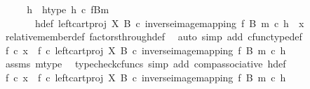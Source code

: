 \begin{isabellebody}
\ \ \isamarkupfalse%
\ \isamarkupfalse%
\ h\ \ h{\isacharunderscore}{\kern0pt}type{\isacharcolon}{\kern0pt}\ {\isachardoublequoteopen}h\ {\isasymin}\isactrlsub c\ {\isacharparenleft}{\kern0pt}f\isactrlsup {\isacharminus}{\kern0pt}B{\isasymrparr}\isactrlbsub m\isactrlesub {\isacharparenright}{\kern0pt}{\isachardoublequoteclose}\isanewline
\ \ \ \ \ \ \ h{\isacharunderscore}{\kern0pt}def{\isacharcolon}{\kern0pt}\ {\isachardoublequoteopen}{\isacharparenleft}{\kern0pt}left{\isacharunderscore}{\kern0pt}cart{\isacharunderscore}{\kern0pt}proj\ X\ B\ {\isasymcirc}\isactrlsub c\ inverse{\isacharunderscore}{\kern0pt}image{\isacharunderscore}{\kern0pt}mapping\ f\ B\ m{\isacharparenright}{\kern0pt}\ {\isasymcirc}\isactrlsub c\ h\ {\isacharequal}{\kern0pt}\ x{\isachardoublequoteclose}\isanewline
\ \ \ \ \isamarkupfalse%
\ relative{\isacharunderscore}{\kern0pt}member{\isacharunderscore}{\kern0pt}def{}\ factors{\isacharunderscore}{\kern0pt}through{\isacharunderscore}{\kern0pt}def\ \isamarkupfalse%
\ {\isacharparenleft}{\kern0pt}auto\ simp\ add{\isacharcolon}{\kern0pt}\ cfunc{\isacharunderscore}{\kern0pt}type{\isacharunderscore}{\kern0pt}def{\isacharparenright}{\kern0pt}\isanewline
\ \ \isamarkupfalse%
\ \isamarkupfalse%
\ {\isachardoublequoteopen}f\ {\isasymcirc}\isactrlsub c\ x\ {\isacharequal}{\kern0pt}\ f\ {\isasymcirc}\isactrlsub c\ left{\isacharunderscore}{\kern0pt}cart{\isacharunderscore}{\kern0pt}proj\ X\ B\ {\isasymcirc}\isactrlsub c\ inverse{\isacharunderscore}{\kern0pt}image{\isacharunderscore}{\kern0pt}mapping\ f\ B\ m\ {\isasymcirc}\isactrlsub c\ h{\isachardoublequoteclose}\isanewline
\ \ \ \ \isamarkupfalse%
\ assms\ m{\isacharunderscore}{\kern0pt}type\ \isamarkupfalse%
\ {\isacharparenleft}{\kern0pt}typecheck{\isacharunderscore}{\kern0pt}cfuncs{\isacharcomma}{\kern0pt}\ simp\ add{\isacharcolon}{\kern0pt}\ comp{\isacharunderscore}{\kern0pt}associative{}\ h{\isacharunderscore}{\kern0pt}def{\isacharparenright}{\kern0pt}\isanewline
\ \ \isamarkupfalse%
\ \isamarkupfalse%
\ {\isachardoublequoteopen}f\ {\isasymcirc}\isactrlsub c\ x\ {\isacharequal}{\kern0pt}\ {\isacharparenleft}{\kern0pt}f\ {\isasymcirc}\isactrlsub c\ left{\isacharunderscore}{\kern0pt}cart{\isacharunderscore}{\kern0pt}proj\ X\ B\ {\isasymcirc}\isactrlsub c\ inverse{\isacharunderscore}{\kern0pt}image{\isacharunderscore}{\kern0pt}mapping\ f\ B\ m{\isacharparenright}{\kern0pt}\ {\isasymcirc}\isactrlsub c\ h{\isachardoublequoteclose}\isanewline

\end{isabellebody}
